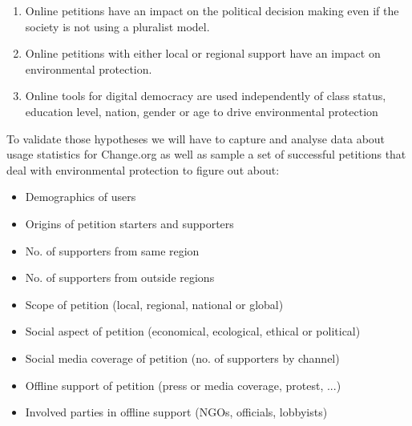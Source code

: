 \begin{enumerate}
    \item Online petitions have an impact on the political decision making even if the society is not using a pluralist model. 
    \item Online petitions with either local or regional support have an impact on environmental protection.
    \item Online tools for digital democracy are used independently of class status, education level, nation, gender or age to drive environmental protection
\end{enumerate}

To validate those hypotheses we will have to capture and analyse data about usage statistics for Change.org as well as sample a set of successful petitions that deal with environmental protection to figure out about:

\begin{itemize}
    \item Demographics of users
    \item Origins of petition starters and supporters
    \item No. of supporters from same region
    \item No. of supporters from outside regions
    \item Scope of petition (local, regional, national or global)
    \item Social aspect of petition (economical, ecological, ethical or political)
    \item Social media coverage of petition (no. of supporters by channel)
    \item Offline support of petition (press or media coverage, protest, ...)
    \item Involved parties in offline support (NGOs, officials, lobbyists)
\end{itemize}

